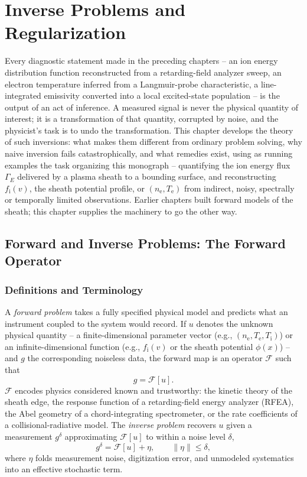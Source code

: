 \chapter{Inverse Problems and Regularization}
\label{ch:inverse}

Every diagnostic statement made in the preceding chapters -- an ion energy distribution function reconstructed from a retarding-field analyzer sweep, an electron temperature inferred from a Langmuir-probe characteristic, a line-integrated emissivity converted into a local excited-state population -- is the output of an act of inference. A measured signal is never the physical quantity of interest; it is a transformation of that quantity, corrupted by noise, and the physicist's task is to undo the transformation. This chapter develops the theory of such inversions: what makes them different from ordinary problem solving, why naive inversion fails catastrophically, and what remedies exist, using as running examples the task organizing this monograph -- quantifying the ion energy flux $\Gamma_{E}$ delivered by a plasma sheath to a bounding surface, and reconstructing $f_{\mathrm{i}}(v)$, the sheath potential profile, or $(n_{\mathrm{e}}, T_{\mathrm{e}})$ from indirect, noisy, spectrally or temporally limited observations. Earlier chapters built forward models of the sheath; this chapter supplies the machinery to go the other way.

\section{Forward and Inverse Problems: The Forward Operator}
\label{sec:forward-inverse}

\subsection{Definitions and Terminology}

A \emph{forward problem} takes a fully specified physical model and predicts what an instrument coupled to the system would record. If $u$ denotes the unknown physical quantity -- a finite-dimensional parameter vector (e.g., $(n_{\mathrm{e}}, T_{\mathrm{e}}, T_{\mathrm{i}})$) or an infinite-dimensional function (e.g., $f_{\mathrm{i}}(v)$ or the sheath potential $\phi(x)$) -- and $g$ the corresponding noiseless data, the forward map is an operator $\mathcal{F}$ such that
\begin{equation}
g = \mathcal{F}[u].
\label{eq:forward-op}
\end{equation}
$\mathcal{F}$ encodes physics considered known and trustworthy: the kinetic theory of the sheath edge, the response function of a retarding-field energy analyzer (RFEA), the Abel geometry of a chord-integrating spectrometer, or the rate coefficients of a collisional-radiative model. The \emph{inverse problem} recovers $u$ given a measurement $g^{\delta}$ approximating $\mathcal{F}[u]$ to within a noise level $\delta$,
\begin{equation}
g^{\delta} = \mathcal{F}[u] + \eta, \qquad \|\eta\| \le \delta,
\label{eq:noisy-data}
\end{equation}
where $\eta$ folds measurement noise, digitization error, and unmodeled systematics into an effective stochastic term.

